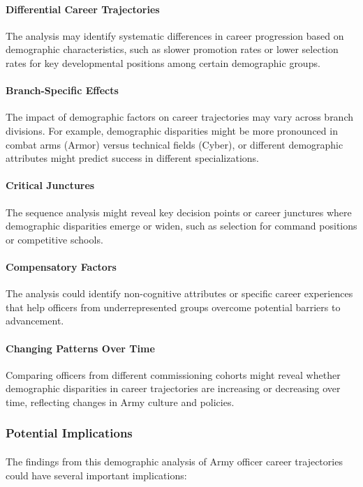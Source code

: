 \documentclass[../main.tex]{subfiles}
\begin{document}
\paragraph{Differential Career Trajectories} The analysis may identify systematic differences in career progression based on demographic characteristics, such as slower promotion rates or lower selection rates for key developmental positions among certain demographic groups.

\paragraph{Branch-Specific Effects} The impact of demographic factors on career trajectories may vary across branch divisions. For example, demographic disparities might be more pronounced in combat arms (Armor) versus technical fields (Cyber), or different demographic attributes might predict success in different specializations.

\paragraph{Critical Junctures} The sequence analysis might reveal key decision points or career junctures where demographic disparities emerge or widen, such as selection for command positions or competitive schools.

\paragraph{Compensatory Factors} The analysis could identify non-cognitive attributes or specific career experiences that help officers from underrepresented groups overcome potential barriers to advancement.

\paragraph{Changing Patterns Over Time} Comparing officers from different commissioning cohorts might reveal whether demographic disparities in career trajectories are increasing or decreasing over time, reflecting changes in Army culture and policies.

\subsubsection{Potential Implications}

\paragraph{} The findings from this demographic analysis of Army officer career trajectories could have several important implications:
\end{document}

